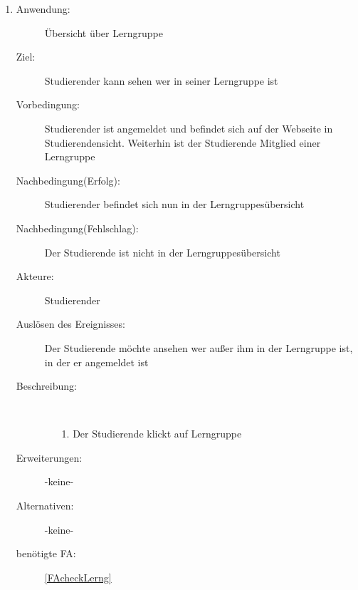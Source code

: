 \documentclass[parskip=full]{scrartcl}
\newcommand{\swtLabel}[1]{\textbf{/#1\arabic*0/}}
\begin{document}
\begin{enumerate}[label=\swtLabel{S}]
   \item \label{UCstudUebersichtLernG}
  \begin{description}
  \item[Anwendung:] Übersicht über \gls{Lerngruppe}
  \item[Ziel:] Studierender kann sehen wer in seiner \gls{Lerngruppe} ist
  	\item[Vorbedingung:] Studierender ist angemeldet und befindet sich auf der
  	Webseite in Studierendensicht. Weiterhin ist der Studierende Mitglied einer
  	\gls{Lerngruppe}
  	\item[Nachbedingung(Erfolg):] Studierender befindet sich nun in der
  	\glspl{Lerngruppe}übersicht
  	\item[Nachbedingung(Fehlschlag):] Der Studierende ist nicht in der
  	\glspl{Lerngruppe}übersicht
  	\item[Akteure:] Studierender
  	\item[Auslösen des Ereignisses:] Der Studierende möchte ansehen wer außer ihm
  	in der \gls{Lerngruppe} ist, in der er angemeldet ist
  	\item[Beschreibung:]~
  	\begin{enumerate}
  	  \item[1.] Der Studierende klickt auf \gls{Lerngruppe} %
 
  	\end{enumerate}
  	\item[Erweiterungen:] -keine-
  	
  	\item[Alternativen:] -keine-
  	
  	 \item[benötigte FA:] \ref{FAcheckLerng}
  \end{description}
  

\end{enumerate}
\end{document}
